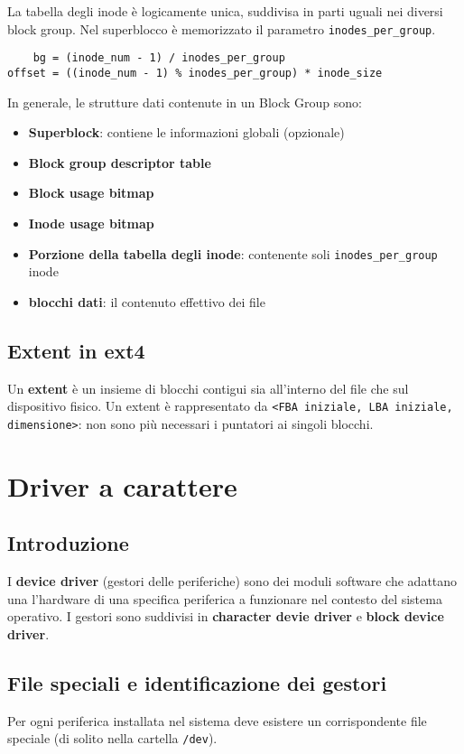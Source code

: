 \documentclass[12pt, a4paper]{report}
\begin{document}
La tabella degli inode è logicamente unica, suddivisa in parti uguali nei
diversi block group. Nel superblocco è memorizzato il parametro
\texttt{inodes\_per\_group}.
\begin{verbatim}
    bg = (inode_num - 1) / inodes_per_group	
offset = ((inode_num - 1) % inodes_per_group) * inode_size
\end{verbatim}

In generale, le strutture dati contenute in un Block Group sono:
\begin{itemize}
	\item \textbf{Superblock}: contiene le informazioni globali (opzionale)
	\item \textbf{Block group descriptor table}
	\item \textbf{Block usage bitmap}
	\item \textbf{Inode usage bitmap}
	\item \textbf{Porzione della tabella degli inode}: contenente  soli
		\texttt{inodes\_per\_group} inode
	\item \textbf{blocchi dati}: il contenuto effettivo dei file
\end{itemize}

\section{Extent in ext4}
Un \textbf{extent} è un insieme di blocchi contigui sia all'interno del file
che sul dispositivo fisico. Un extent è rappresentato da \texttt{<FBA iniziale,
LBA iniziale, dimensione>}: non sono più necessari i puntatori ai singoli
blocchi.

\chapter{Driver a carattere}
\section{Introduzione}
I \textbf{device driver} (gestori delle periferiche) sono dei moduli software
che adattano una l'hardware di una specifica periferica a funzionare nel
contesto del sistema operativo. I gestori sono suddivisi in \textbf{character
devie driver} e \textbf{block device driver}.

\section{File speciali e identificazione dei gestori}
Per ogni periferica installata nel sistema deve esistere un corrispondente file
speciale (di solito nella cartella \texttt{/dev}).
\end{document}
